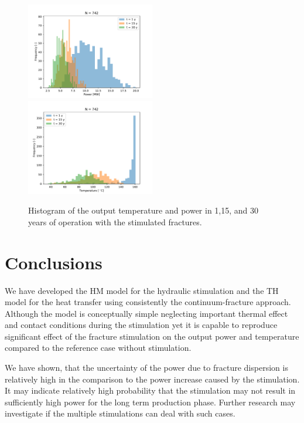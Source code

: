 \documentclass{article}
\begin{document}
\begin{figure}
\includegraphics[width=0.5\textwidth]{power_histogram.pdf}
\includegraphics[width=0.5\textwidth]{temp_histogram.pdf}
\caption{Histogram of the output temperature and power in 1,15, and 30 years of operation with the stimulated fractures.}
\end{figure}

\section{Conclusions}
We have developed the HM model for the hydraulic stimulation and the TH model for the heat transfer using consistently the continuum-fracture approach. Although the model is conceptually simple neglecting important thermal effect and contact conditions during the stimulation yet it is capable to reproduce significant effect of the fracture stimulation on the output power and temperature compared to the reference case without stimulation. 

We have shown, that the uncertainty of the power due to fracture dispersion is relatively high in the comparison to the power increase caused by the stimulation. It may indicate relatively high probability
that the stimulation may not result in sufficiently high power for the long term production phase. Further research may investigate if the multiple stimulations can deal with such cases. 
\end{document}
